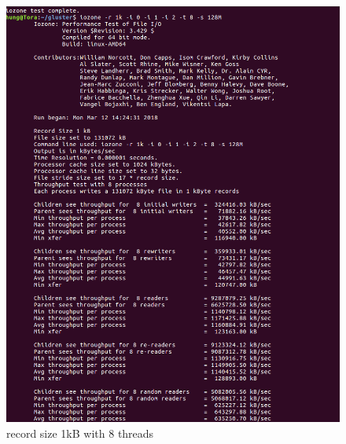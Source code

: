 \documentclass[12pt]{article}
\begin{document}
     \begin{figure}[H]
        \centering
       \includegraphics[scale=0.4]{1kB 8 proccesses.png}
       \caption{record size 1kB with 8 threads}
    \end{figure}
\end{document}

